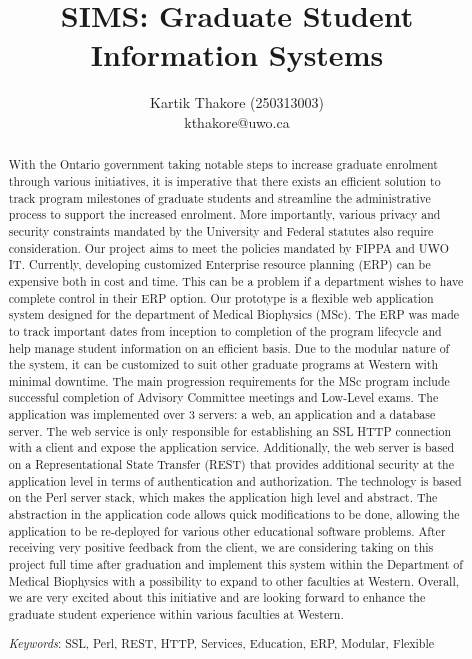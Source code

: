 \documentclass{journal}
\newcommand{\Keywords}[1]{\par\noindent
{\small{\em Keywords\/}: #1}}
\begin{document}

\nocite{*}
\title{SIMS: Graduate Student Information Systems}
\author{Kartik Thakore (250313003)\\kthakore@uwo.ca}
\maketitle

\begin{abstract}
With the Ontario government taking notable steps to increase
graduate enrolment through various initiatives, it is imperative that there exists an efficient
solution to track program milestones of graduate students and streamline the administrative
process to support the increased enrolment. More importantly, various privacy and security constraints
mandated by the University and Federal statutes also require consideration. Our project aims to meet the policies
mandated by FIPPA and UWO IT. Currently, developing customized Enterprise resource planning (ERP) can be expensive both in cost 
and time. This can be a problem if a department wishes to have complete control in their ERP option. Our prototype is a flexible web application 
system designed for the department of Medical Biophysics (MSc). The ERP was made
to track important dates from inception to completion of the program lifecycle and help manage
student information on an efficient basis. Due to the modular nature of the system, it can be
customized to suit other graduate programs at Western with minimal downtime. The main progression
requirements for the MSc program include successful completion of Advisory Committee
meetings and Low-Level exams. The application was implemented over 3 servers: a web, an application and a database server.
The web service is only responsible for establishing an SSL HTTP connection with a client and expose the application service.  
Additionally, the web server is based on a Representational State Transfer (REST) that provides additional security at the application level in terms of authentication and authorization. 
The technology is based on the Perl server stack, which makes the application high level and abstract. The abstraction in the application code
allows quick modifications to be done, allowing the application to be re-deployed for various other educational software problems. 
After receiving very positive feedback from the client, we are considering taking on this project full
time after graduation and implement this system within the Department of Medical Biophysics
with a possibility to expand to other faculties at Western. Overall, we are very excited about this
initiative and are looking forward to enhance the graduate student experience within various
faculties at Western.
\Keywords{ SSL, Perl, REST, HTTP, Services, Education, ERP, Modular, Flexible}
\end{abstract}
\end{document}
